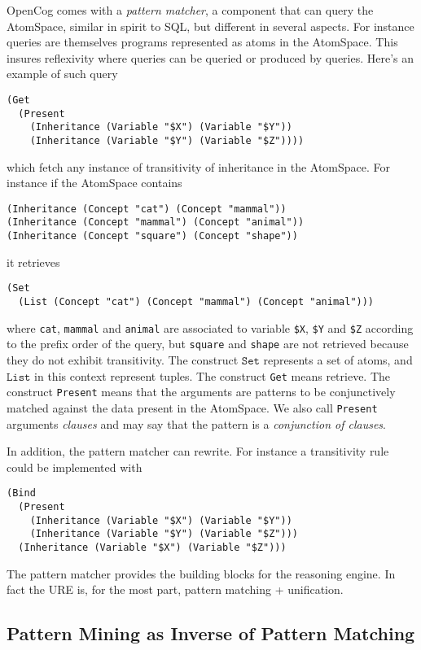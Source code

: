 \documentclass[runningheads]{llncs}
\begin{document}
OpenCog comes with a \emph{pattern matcher}, a component that can
query the AtomSpace, similar in spirit to SQL, but different in
several aspects. For instance queries are themselves programs
represented as atoms in the AtomSpace. This insures reflexivity where
queries can be queried or produced by queries. Here's an example of
such query
\begin{verbatim}
(Get
  (Present
    (Inheritance (Variable "$X") (Variable "$Y"))
    (Inheritance (Variable "$Y") (Variable "$Z"))))
\end{verbatim}
which fetch any instance of transitivity of inheritance in the
AtomSpace. For instance if the AtomSpace contains
\begin{verbatim}
(Inheritance (Concept "cat") (Concept "mammal"))
(Inheritance (Concept "mammal") (Concept "animal"))
(Inheritance (Concept "square") (Concept "shape"))
\end{verbatim}
it retrieves
\begin{verbatim}
(Set
  (List (Concept "cat") (Concept "mammal") (Concept "animal")))
\end{verbatim}
where \texttt{cat}, \texttt{mammal} and \texttt{animal} are associated
to variable \texttt{\$X}, \texttt{\$Y} and \texttt{\$Z} according to
the prefix order of the query, but \texttt{square} and \texttt{shape}
are not retrieved because they do not exhibit transitivity. The
construct $\texttt{Set}$ represents a set of atoms, and
$\texttt{List}$ in this context represent tuples. The construct
\texttt{Get} means retrieve. The construct \texttt{Present} means that
the arguments are patterns to be conjunctively matched against the
data present in the AtomSpace. We also call \texttt{Present} arguments
\emph{clauses} and may say that the pattern is a \emph{conjunction of
  clauses}.

In addition, the pattern matcher can rewrite. For instance a
transitivity rule could be implemented with
\begin{verbatim}
(Bind
  (Present
    (Inheritance (Variable "$X") (Variable "$Y"))
    (Inheritance (Variable "$Y") (Variable "$Z")))
  (Inheritance (Variable "$X") (Variable "$Z")))
\end{verbatim}
The pattern matcher provides the building blocks for the reasoning
engine. In fact the URE is, for the most part, pattern matching +
unification.

\subsection{Pattern Mining as Inverse of Pattern Matching}
\end{document}
